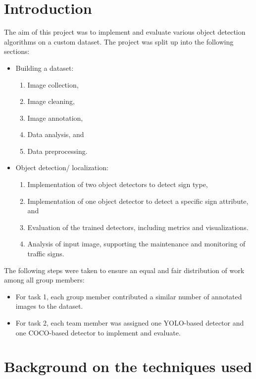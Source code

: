 \documentclass{article}
\begin{document}
\section{Introduction}
The aim of this project was to implement and evaluate various object detection algorithms on a custom dataset. The project was split up into the following sections:
\begin{itemize}
    \item Building a dataset:
          \begin{enumerate}
              \item Image collection,
              \item Image cleaning,
              \item Image annotation,
              \item Data analysis, and
              \item Data preprocessing.
          \end{enumerate}

    \item Object detection/ localization:
          \begin{enumerate}
              \item Implementation of two object detectors to detect sign type,
              \item Implementation of one object detector to detect a specific sign attribute, and
              \item Evaluation of the trained detectors, including metrics and visualizations.
              \item Analysis of input image, supporting the maintenance and monitoring of traffic signs. %
          \end{enumerate}
\end{itemize}
The following steps were taken to ensure an equal and fair distribution of work among all group members:
\begin{itemize}
    \item For task 1, each group member contributed a similar number of annotated images to the dataset.
    \item For task 2, each team member was assigned one YOLO-based detector and one COCO-based detector to implement and evaluate.
\end{itemize}


\section{Background on the techniques used}
\end{document}
